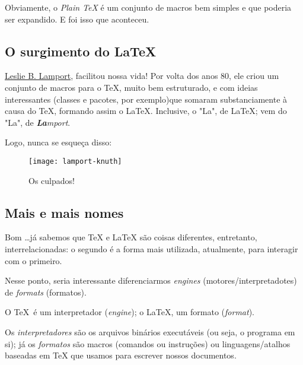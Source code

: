 Obviamente, o \textit{Plain \TeX} é um conjunto de macros bem simples e que 
poderia ser expandido.
E foi isso que aconteceu.

\subsection{O surgimento do \LaTeX} %

\href{https://pt.wikipedia.org/wiki/Leslie_Lamport}{Leslie B. Lamport}, facilitou 
nossa vida! 
Por volta dos anos 80, ele criou um conjunto de macros para o \TeX, muito bem 
estruturado, e com ideias interessantes (classes e pacotes, por exemplo)que 
somaram substanciamente à causa do \TeX{}, formando assim o \LaTeX.
Inclusive, o "La", de \LaTeX{}; vem do "La", de \textit{\textbf{La}mport}.

Logo, nunca se esqueça disso:

\begin{center}
\end{center}

\begin{figure}[!ht]
  \centering
  \texttt{[image: lamport-knuth]}
  \caption{Os culpados!}
\end{figure}

\subsection{Mais e mais nomes} %

Bom \ldots já sabemos que  \TeX{} e \LaTeX{} são coisas diferentes, entretanto,
interrelacionadas: o segundo é a forma mais utilizada, atualmente, para 
interagir com o primeiro.

Nesse ponto, seria interessante diferenciarmos \textit{engines} (motores/interpretadotes) 
de \textit{formats} (formatos).

O \TeX\ é um interpretador (\textit{engine}); o \LaTeX, um formato (\textit{format}).


Os \textit{interpretadores} são os arquivos binários executáveis (ou seja, o 
programa em si); já os \textit{formatos} são macros (comandos ou instruções) ou 
linguagens/atalhos baseadas em \TeX{} que usamos para escrever nossos documentos.

